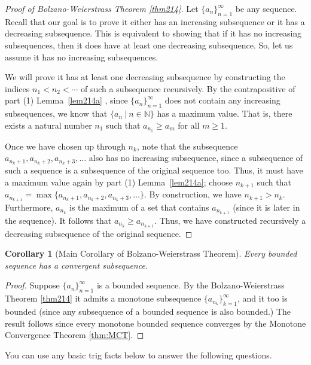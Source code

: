 \documentclass[12pt]{amsart}
\newcommand{\N}{\mathbb{N}}
\numberwithin{equation}{section}
\theoremstyle{plain} %
\newtheorem{cor}[equation]{Corollary}
\theoremstyle{definition}
\theoremstyle{remark}
\begin{document}
\begin{proof}[Proof of Bolzano-Weierstrass Theorem \ref{thm214}]
Let $\{a_n\}_{n=1}^\infty$ be any sequence. Recall that our goal is to prove it either has an increasing subsequence or it has a decreasing subsequence. This is equivalent to showing that if it has no increasing
subsequences, then it does have at least one decreasing subsequence.
So, let us assume it has no increasing subsequences. 


We will prove it has at least one
decreasing subsequence by constructing the indices $n_1<n_2< \cdots$ of such a subsequence recursively. 
By the contrapositive of part (1) Lemma~\ref{lem214a} , since $\{a_n\}_{n=1}^\infty$ does not contain any increasing subsequences, we know that  
$\{ a_n \ | \ n\in \N\}$ has a maximum value. That is,
there exists a natural number $n_1$ such that $a_{n_1}
\geq a_m$ for all $m \geq 1$.

Once we have chosen up through $n_k$, note that the subsequence $a_{n_k +1} , a_{n_k+2},a_{n_k+3},\ldots$ also has no increasing subsequence, since a subsequence of such a sequence is a subsequence of the original sequence too. Thus, it must have a maximum value again by part (1) Lemma~\ref{lem214a}; choose $n_{k+1}$ such that $a_{n_{k+1}} = \max\{ a_{n_k +1} , a_{n_k+2},a_{n_k+3}, \dots\}$. By construction, we have $n_{k+1} > n_k$. Furthermore, $a_{n_{k}}$ is the maximum of a set that contains $a_{n_{k+1}}$ (since it is later in the sequence). It follows that $a_{n_k} \geq a_{n_{k+1}}$. Thus, we have constructed recursively a decreasing subsequence of the original sequence.
\end{proof}




\begin{cor}[Main Corollary of Bolzano-Weierstrass Theorem] Every bounded sequence has a convergent subsequence.
\end{cor}

\begin{proof} Suppose $\{a_n\}_{n=1}^\infty$ is a bounded sequence. 
By the Bolzano-Weierstrass Theorem \ref{thm214} it admits a monotone subsequence
$\{a_{n_k}\}_{k=1}^\infty$, and it too is bounded (since 
any subsequence of a bounded sequence is also bounded.) 
The result follows since every monotone bounded sequence converges by the Monotone Convergence Theorem \ref{thm:MCT}.
\end{proof}

\newpage

You can use any basic trig facts below to answer the following questions. 
\end{document}
